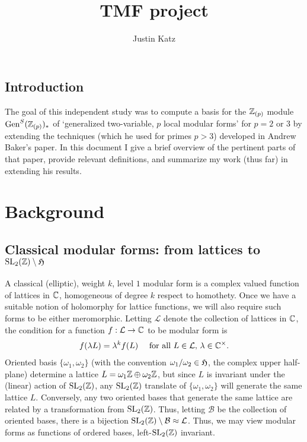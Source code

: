 \documentclass[11pt]{amsart}
\title{TMF project}
\author{Justin Katz}
\newcommand{\gen}{\operatorname{Gen}}
\renewcommand{\L}{\mathcal{L}}
\newcommand{\B}{\mathcal{B}}
\begin{document}
\maketitle
\subsection{Introduction}
The goal of this independent study was to compute a basis for the $\mathbb{Z}_{(p)}$ module $\gen^{S}(\Z_{(p)})_{*}$ of `generalized two-variable, $p$ local modular forms' for $p=2$ or $3$ by extending the techniques (which he used for primes $p>3$) developed in Andrew Baker's paper. In this document I give a brief overview of the pertinent parts of that paper, provide relevant definitions, and summarize my work (thus far) in extending his results.

\section{Background}
\subsection{Classical modular forms: from lattices to $\operatorname{SL}_{2}(\mathbb{Z}) \setminus \mathfrak{H}$}
A classical (elliptic), weight $k$, level $1$ modular form is a complex valued function of lattices in $\mathbb{C}$, homogeneous of degree $k$ respect to homothety. Once we have a suitable notion of holomorphy for lattice functions, we will also require such forms to be either meromorphic. Letting $\L$ denote the collection of lattices in $\mathbb{C}$, the condition for a function $f:\L\to \C$ to be modular form is 
	\begin{align*}
		f(\lambda L)=\lambda^{k}f(L) \quad \text{ for all $L\in \L$, $\lambda \in \C^{\times}$}.
	\end{align*}
Oriented basis $\{\omega_{1},\omega_{2}\}$  (with the convention $\omega_{1}/\omega_{2}\in \mathfrak{H}$, the complex upper half-plane) determine a lattice $L=\omega_{1}\mathbb{Z}\oplus \omega_{2}\mathbb{Z}$, but since $L$ is invariant under the (linear) action of $\operatorname{SL}_{2}(\mathbb{Z})$, any $\operatorname{SL}_{2}(\mathbb{Z})$ translate of $\{\omega_{1},\omega_{2}\}$ will generate the same lattice $L$. Conversely, any two oriented bases that generate the same lattice are related by a transformation from $\operatorname{SL}_{2}(\mathbb{Z})$. Thus, letting $\B$ be the collection of oriented bases, there is a bijection $\SL_{2}(\Z)\setminus \B \approx \L$. Thus, we may view modular forms as functions of ordered bases, left-$\operatorname{SL}_{2}(\mathbb{Z})$ invariant.
\end{document}
